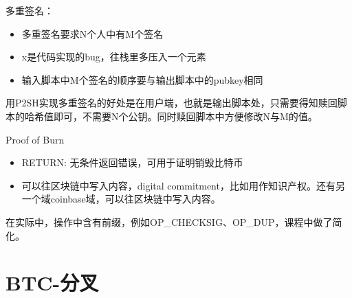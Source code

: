 \documentclass[10pt]{ctexart}
\begin{document}
多重签名：
\begin{itemize}
    \item 多重签名要求N个人中有M个签名
    \item x是代码实现的bug，往栈里多压入一个元素
    \item 输入脚本中M个签名的顺序要与输出脚本中的pubkey相同
\end{itemize}

用P2SH实现多重签名的好处是在用户端，也就是输出脚本处，只需要得知赎回脚本的哈希值即可，不需要N个公钥。同时赎回脚本中方便修改N与M的值。

Proof of Burn
\begin{itemize}
    \item RETURN: 无条件返回错误，可用于证明销毁比特币
    \item 可以往区块链中写入内容，digital commitment，比如用作知识产权。还有另一个域coinbase域，可以往区块链中写入内容。
\end{itemize}

在实际中，操作中含有前缀，例如OP\_CHECKSIG、OP\_DUP，课程中做了简化。

  
\section{BTC-分叉}
\end{document}
